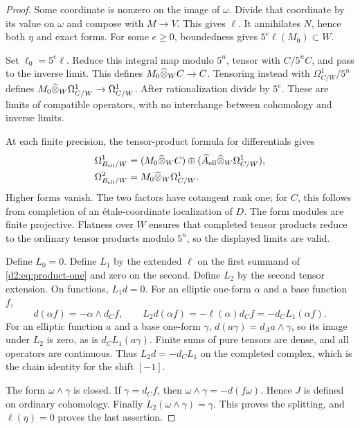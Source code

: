 \begin{proof}
Some coordinate is nonzero on the image of \(\omega\).
Divide that coordinate by its value on \(\omega\) and compose with
\(M\to V\). This gives \(\ell\).
It annihilates \(N\), hence both \(\eta\) and exact forms.
For some \(e\ge0\), boundedness gives \(5^e\ell(M_0)\subset W\).

Set \(\ell_0=5^e\ell\).
Reduce this integral map modulo \(5^n\), tensor with \(C/5^nC\),
and pass to the inverse limit.
This defines \(M_0\widehat\otimes_WC\to C\).
Tensoring instead with \(\Omega^1_{C/W}/5^n\) defines
\(M_0\widehat\otimes_W\Omega^1_{C/W}\to\Omega^1_{C/W}\).
After rationalization divide by \(5^e\).
These are limits of compatible operators, with no interchange
between cohomology and inverse limits.

At each finite precision, the tensor-product formula for
differentials gives
\begin{align}
 \Omega^1_{B_{\mathrm{ell}}/W}
 &=(M_0\widehat\otimes_WC)\oplus
   (\widehat A_{\mathrm{ell}}\widehat\otimes_W\Omega^1_{C/W}),\label{d2:eq:product-one}\\
 \Omega^2_{B_{\mathrm{ell}}/W}
 &=M_0\widehat\otimes_W\Omega^1_{C/W}.\label{d2:eq:product-two}
\end{align}
Higher forms vanish.
The two factors have cotangent rank one; for \(C\), this follows
from completion of an \'etale-coordinate localization of \(D\).
The form modules are finite projective.
Flatness over \(W\) ensures that completed tensor products reduce to
the ordinary tensor products modulo \(5^n\), so the displayed limits
are valid.

Define \(L_0=0\).
Define \(L_1\) by the extended \(\ell\) on the first summand of
\eqref{d2:eq:product-one} and zero on the second.
Define \(L_2\) by the second tensor extension.
On functions, \(L_1d=0\).
For an elliptic one-form \(\alpha\) and a base function \(f\),
\[
 d(\alpha f)=-\alpha\wedge d_Cf,\qquad
 L_2d(\alpha f)=-\ell(\alpha)d_Cf=-d_CL_1(\alpha f).
\]
For an elliptic function \(a\) and a base one-form \(\gamma\),
\(d(a\gamma)=d_Aa\wedge\gamma\), so its image under \(L_2\) is
zero, as is \(d_CL_1(a\gamma)\).
Finite sums of pure tensors are dense, and all operators are
continuous. Thus \(L_2d=-d_CL_1\) on the completed complex, which is
the chain identity for the shift \([-1]\).

The form \(\omega\wedge\gamma\) is closed.
If \(\gamma=d_Cf\), then
\(\omega\wedge\gamma=-d(f\omega)\).
Hence \(J\) is defined on ordinary cohomology.
Finally \(L_2(\omega\wedge\gamma)=\gamma\).
This proves the splitting, and \(\ell(\eta)=0\) proves the last
assertion.
\end{proof}

